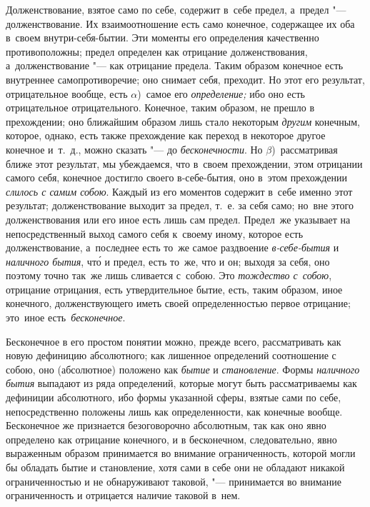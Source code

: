 Долженствование, взятое само по себе, содержит в~себе предел, а~предел "---
долженствование. Их взаимоотношение есть само конечное, содержащее их оба
в~своем внутри-себя-бытии. Эти моменты его определения качественно
противоположны; предел определен как отрицание долженствования,
а~долженствование "--- как отрицание предела. Таким образом конечное есть
внутреннее самопротиворечие; оно снимает себя, преходит. Но этот его результат,
отрицательное вообще, есть $\alpha$)~самое его {\em определение;} ибо оно есть
отрицательное отрицательного. Конечное, таким образом, не прешло в прехождении;
оно ближайшим образом лишь стало некоторым {\em другим} конечным, которое,
однако, есть также прехождение как переход в некоторое другое конечное и~т.~д.,
можно сказать "--- до {\em бесконечности}. Но $\beta$)~рассматривая ближе этот
результат, мы убеждаемся, что в~своем прехождении, этом отрицании самого себя,
конечное достигло своего в-себе-бытия, оно в~этом прехождении
{\em слилось с самим собою}. Каждый из его моментов содержит в~себе именно этот
результат; долженствование выходит за предел, т.~е. за себя само; но~вне этого
долженствования или его иное есть лишь сам предел. Предел~же указывает
на непосредственный выход самого себя к~своему иному, которое есть
долженствование, а~последнее есть то~же самое раздвоение {\em в-себе-бытия} и
{\em наличного бытия}, чт\'{о} и предел, есть то~же, что и он; выходя за себя,
оно поэтому точно так~же лишь сливается с~собою. Это {\em тождество с~собою},
отрицание отрицания, есть утвердительное бытие, есть, таким образом, иное
конечного, долженствующего иметь своей определенностью первое отрицание;
это~иное есть~{\em бесконечное}.


Бесконечное в его простом понятии можно, прежде всего, рассматривать как новую
дефиницию абсолютного; как лишенное определений соотношение с собою, оно
(абсолютное) положено как {\em бытие} и {\em становление}. Формы
{\em наличного бытия} выпадают из ряда определений, которые могут быть
рассматриваемы как дефиниции абсолютного, ибо формы указанной сферы, взятые
сами по себе, непосредственно положены лишь как определенности, как конечные
вообще. Бесконечное же признается безоговорочно абсолютным, так как оно явно
определено как отрицание конечного, и в бесконечном, следовательно, явно
выраженным образом принимается во внимание ограниченность, которой могли бы
обладать бытие и становление, хотя сами в себе они не обладают никакой
ограниченностью и не обнаруживают таковой, "--- принимается во внимание
ограниченность и отрицается наличие таковой в~нем.


